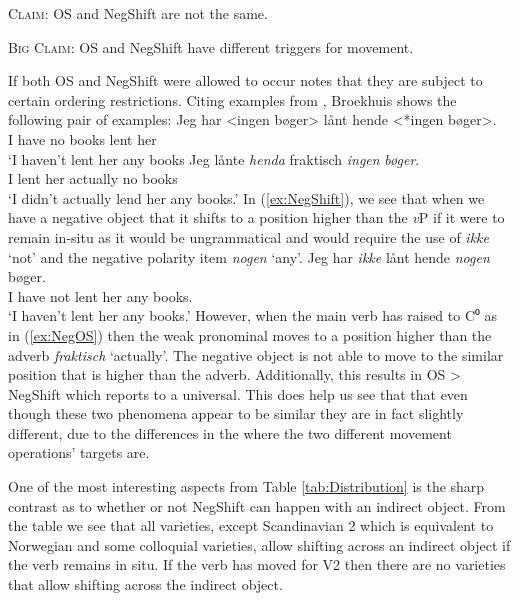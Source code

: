 \documentclass[12pt, letterpaper]{article}
\begin{document}
\begin{tcolorbox}[width=\linewidth]
\textsc{Claim:} OS and NegShift are not the same.

\textsc{Big Claim:} OS and NegShift have different triggers for movement. 
\end{tcolorbox}
If both OS and NegShift were allowed to occur \citeauthor{broekhuisUnificationObjectShift2020} notes that they are subject to certain ordering restrictions. Citing examples from \citet[163ff]{christensenInterfacesNegationSyntax2005}, Broekhuis shows the following pair of examples:
	\ea 
		\ea \label{ex:NegShift}
		\gll Jeg har <ingen bøger> lånt hende <*ingen bøger>.\\
		I have no books lent her\\
		\glt `I haven't lent her any books
		\ex \label{ex:NegOS}
		\gll Jeg lånte \textit{henda} fraktisch \textit{ingen} \textit{bøger}.\\
		I lent her actually no books\\
		\glt `I didn't actually lend her any books.'
		\z 
	\z
In (\ref{ex:NegShift}), we see that when we have a negative object that it shifts to a position higher than the \textit{v}P if it were to remain in-situ as it would be ungrammatical and would require the use of \textit{ikke} `not' and the negative polarity item \textit{nogen} `any'.
	\ea
	\gll Jeg har \textit{ikke} lånt hende \textit{nogen} bøger.\\
	I have not lent her any books.\\
	\glt `I haven't lent her any books.'
	\z
However, when the main verb has raised to C⁰ as in (\ref{ex:NegOS}) then the weak pronominal moves to a position higher than the adverb \textit{fraktisch} `actually'. The negative object is not able to move to the similar position that is higher than the adverb. Additionally, this results in OS > NegShift which \citeauthor{broekhuisUnificationObjectShift2020} reports to a universal. This does help us see that that even though these two phenomena appear to be similar they are in fact slightly different, due to the differences in the where the two different movement operations' targets are.




One of the most interesting aspects from Table \ref{tab:Distribution} is the sharp contrast as to whether or not NegShift can happen with an indirect object. From the table we see that all varieties, except Scandinavian 2 which is equivalent to Norwegian and some colloquial varieties, allow shifting across an indirect object if the verb remains in situ. If the verb has moved for V2 then there are no varieties that allow shifting across the indirect object.
\end{document}
